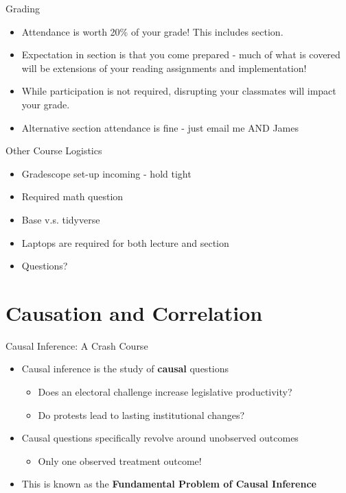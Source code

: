 \documentclass[]{beamer}
\begin{document}
\begin{frame}{Grading}
	\begin{itemize}
		\item Attendance is worth 20\% of your grade! This includes section. 
		\item Expectation in section is that you come prepared - much of what is covered will be extensions of your reading assignments and implementation! 
		\item While participation is not required, disrupting your classmates will impact your grade. 
		\item Alternative section attendance is fine - just email me AND James
	\end{itemize}
\end{frame}

\begin{frame}{Other Course Logistics}
	\begin{itemize}
		\item Gradescope set-up incoming - hold tight 
		\item Required math question 
		\item Base v.s. tidyverse 
		\item Laptops are required for both lecture and section 
		\item \pause Questions?
	\end{itemize}	
\end{frame}

\section{Causation and Correlation}

\begin{frame}{Causal Inference: A Crash Course}

\begin{itemize}
	\item Causal inference is the study of \textbf{causal} questions
	\begin{itemize}
		\item \pause Does an electoral challenge increase legislative productivity? 
		\item \pause Do protests lead to lasting institutional changes? 
	\end{itemize}
	\item Causal questions specifically revolve around unobserved outcomes
	\begin{itemize}
		\item Only one observed treatment outcome!
	\end{itemize}
	\item This is known as the \textbf{Fundamental Problem of Causal Inference}
\end{itemize}
	
\end{frame}
\end{document}
